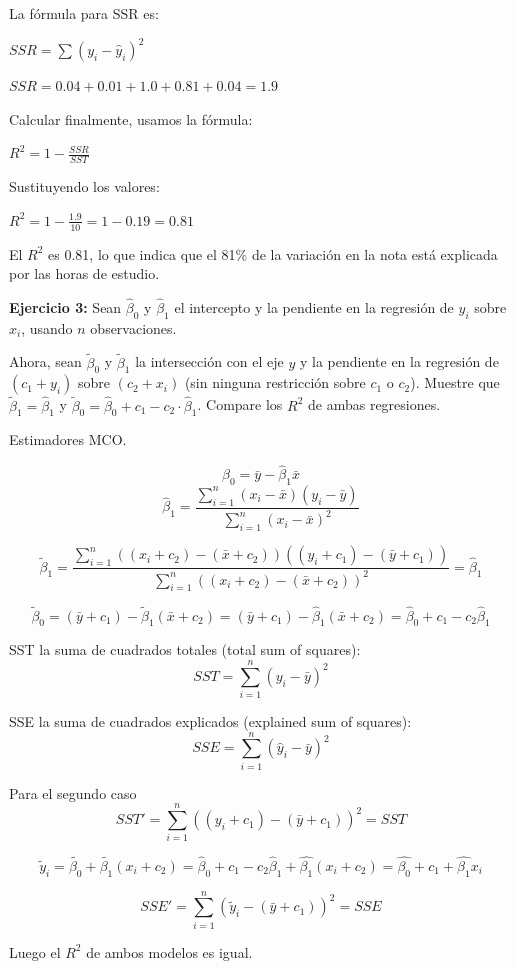 \documentclass[10pt,a4paper]{article}
\begin{document}
\begin{enumerate}
{La fórmula para SSR es:

$SSR = \sum (y_i - \hat{y}_i)^2$

$SSR = 0.04 + 0.01 + 1.0 + 0.81 + 0.04 = 1.9$

 Calcular  finalmente, usamos la fórmula:

$R^2 = 1 - \frac{SSR}{SST}$

Sustituyendo los valores:

$R^2 = 1 - \frac{1.9}{10} = 1 - 0.19 = 0.81$



El $R^2$ es 0.81, lo que indica que el 81\% de la variación en la nota está explicada por las horas de estudio.

}
\end{enumerate}

{\bf Ejercicio 3:} Sean \(\hat{\beta}_0\) y \(\hat{\beta}_1\) el intercepto y la pendiente en la regresión de \(y_i\) sobre \(x_i\), usando \(n\) observaciones.

Ahora, sean \(\tilde{\beta}_0\) y \(\tilde{\beta}_1\) la intersección con el eje \(y\) y la pendiente en la regresión de \((c_1 + y_i)\) sobre \((c_2 + x_i)\) (sin ninguna restricción sobre \(c_1\) o \(c_2\)). Muestre que \(\tilde{\beta}_1 = \hat{\beta}_1\) y \(\tilde{\beta}_0 = \hat{\beta}_0 +c_1- c_2 \cdot \hat{\beta}_1\). Compare los $R^2$ de ambas regresiones.

{\color{red} Estimadores MCO.

$$\hat{\beta}_0 = \bar{y} - \hat{\beta}_1 \bar{x} $$
$$\hat{\beta}_1 = \frac{\sum_{i=1}^{n}(x_i - \bar{x})(y_i-\bar{y})}{\sum_{i=1}^{n}(x_i - \bar{x})^2}$$


$$\tilde{\beta}_1 = \frac{\sum_{i=1}^{n}((x_i+c_2) - (\bar{x}+c_2))((y_i+c_1)-(\bar{y}+c_1))}{\sum_{i=1}^{n}((x_i+c_2) - (\bar{x}+c_2))^2}=\hat{\beta}_1$$

$$\tilde{\beta}_0 = (\bar{y}+c_1) - \tilde{\beta}_1 (\bar{x}+c_2)= (\bar{y}+c_1) - \hat{\beta}_1 (\bar{x}+c_2)=\hat{\beta}_0+c_1-c_2\hat{\beta}_1  $$
}



    
{\color{red} SST la suma de cuadrados totales (total sum of squares):
		\[ SST = \sum_{i=1}^{n} (y_i - \bar{y})^2 \]
		
	 SSE la suma de cuadrados explicados (explained sum of squares):
	{\color{red}	\[ SSE = \sum_{i=1}^{n} (\hat{y}_i - \bar{y})^2 \]}	

 Para el segundo caso
		\[ SST' = \sum_{i=1}^{n} ((y_i+c_1) - (\bar{y}+c_1))^2 =SST\]
		
		
$$\tilde{y}_i=\tilde{\beta_0}+\tilde{\beta_1}(x_i+c_2)=\hat{\beta}_0+c_1-c_2\hat{\beta}_1 + \hat{\beta_1}(x_i+c_2)= \hat{\beta_0}+c_1+\hat{\beta_1}x_i$$
	{\color{red}	\[ SSE' = \sum_{i=1}^{n} (\tilde{y}_i - (\bar{y}+c_1))^2=SSE \]
 
 Luego el $R^2$ de ambos modelos es igual. 
 }		
  
 }
\end{document}
